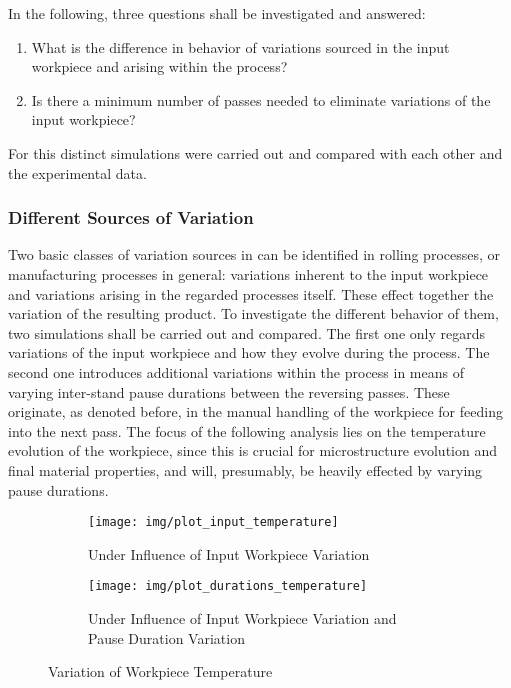 In the following, three questions shall be investigated and answered:
\begin{enumerate}
    \item What is the difference in behavior of variations sourced in the input workpiece and arising within the process?
    \item Is there a minimum number of passes needed to eliminate variations of the input workpiece?
\end{enumerate}

For this distinct simulations were carried out and compared with each other and the experimental data.

\subsubsection{Different Sources of Variation}\label{subsubsec:different-sources-of-variation}

Two basic classes of variation sources in can be identified in rolling processes, or manufacturing processes in general: variations inherent to the input workpiece and variations arising in the regarded processes itself.
These effect together the variation of the resulting product.
To investigate the different behavior of them, two simulations shall be carried out and compared.
The first one only regards variations of the input workpiece and how they evolve during the process.
The second one introduces additional variations within the process in means of varying inter-stand pause durations between the reversing passes.
These originate, as denoted before, in the manual handling of the workpiece for feeding into the next pass.
The focus of the following analysis lies on the temperature evolution of the workpiece, since this is crucial for microstructure evolution and final material properties, and will, presumably, be heavily effected by varying pause durations.

\begin{figure}
    \begin{subfigure}{\linewidth}
        \centering
        \texttt{[image: img/plot\_input\_temperature]}
        \caption{Under Influence of Input Workpiece Variation}
        \label{fig:plot_input_temperature}
    \end{subfigure}
    \begin{subfigure}{\linewidth}
        \centering
        \texttt{[image: img/plot\_durations\_temperature]}
        \caption{Under Influence of Input Workpiece Variation and Pause Duration Variation}
        \label{fig:plot_durations_temperature}
    \end{subfigure}
    \caption{Variation of Workpiece Temperature}
\end{figure}


